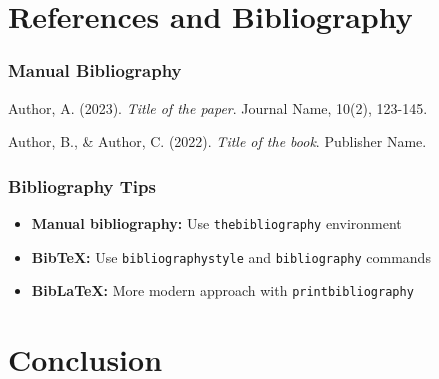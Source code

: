 \documentclass[aspectratio=169,professionalfonts]{beamer}
\begin{document}
\section{References and Bibliography}

\begin{frame}
    \frametitle{Manual Bibliography}
    
    \begin{thebibliography}{9}
        Author, A. (2023). 
        \textit{Title of the paper}. 
        Journal Name, 10(2), 123-145.
        
        Author, B., \& Author, C. (2022). 
        \textit{Title of the book}.
        Publisher Name.
    \end{thebibliography}
\end{frame}

\begin{frame}
    \frametitle{Bibliography Tips}
    
    \begin{tcolorbox}[colback=ugmLightGrey,colframe=ugmBlue,title=Bibliography Options]
        \begin{itemize}
            \item \textbf{Manual bibliography:} Use \texttt{thebibliography} environment
            \item \textbf{BibTeX:} Use \texttt{bibliographystyle} and \texttt{bibliography} commands
            \item \textbf{BibLaTeX:} More modern approach with \texttt{printbibliography}
        \end{itemize}
    \end{tcolorbox}
    
        
% 
% 

\end{frame}

\section{Conclusion}
\end{document}
